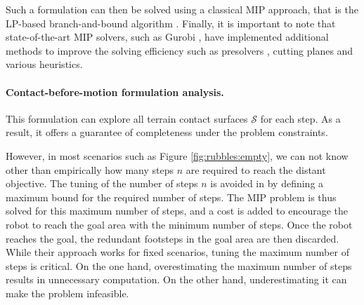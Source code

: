 Such a formulation can then be solved using a classical MIP approach, that is the LP-based branch-and-bound algorithm \cite{gurobi_mip}.
Finally, it is important to note that state-of-the-art MIP solvers, such as Gurobi \cite{gurobi}, have implemented additional methods to improve the solving efficiency such as presolvers \cite{presolve_gurobi_2020}, cutting planes \cite{cutting_plan_gomory_1996} and various heuristics. 

\paragraph{Contact-before-motion formulation analysis.}
This formulation can explore all terrain contact surfaces $\mathcal{S}$ for each step.
As a result, it offers a guarantee of completeness under the problem constraints.

However, in most scenarios such as Figure \ref{fig:rubbles:empty}, we can not know other than empirically how many steps $n$ are required to reach the distant objective.
The tuning of the number of steps $n$ is avoided in \cite{deits2014FootPlanMI} by defining a maximum bound for the required number of steps. The MIP problem is thus solved for this maximum number of steps, and a cost is added to encourage the robot to reach the goal area with the minimum number of steps. 
Once the robot reaches the goal, the redundant footsteps in the goal area are then discarded.
While their approach works for fixed scenarios, tuning the maximum number of steps is critical. 
On the one hand, overestimating the maximum number of steps results in unnecessary computation. 
On the other hand, underestimating it can make the problem infeasible.

